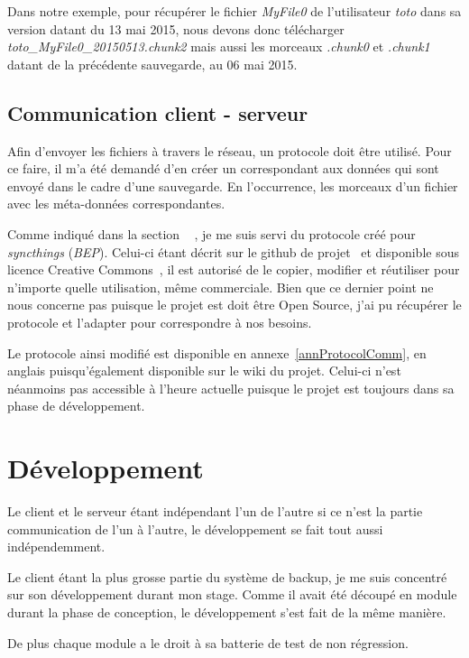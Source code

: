 \documentclass[a4paper,10pt, twoside]{report}
\begin{document}
\begin{spacing}{1.2}
Dans notre exemple, pour r\'ecup\'erer le fichier \textit{MyFile0} de
l'utilisateur \textit{toto}  dans sa version datant du 13 mai 2015, nous devons
donc t\'el\'echarger \textit{toto\_MyFile0\_20150513.chunk2} mais aussi les
morceaux \textit{.chunk0} et \textit{.chunk1} datant de la pr\'ec\'edente
sauvegarde, au 06 mai 2015.

\subsection{Communication client - serveur}
Afin d'envoyer les fichiers \`a travers le r\'eseau, un protocole doit \^etre
utilis\'e. Pour ce faire, il m'a \'et\'e demand\'e d'en cr\'eer un correspondant
aux donn\'ees qui sont envoy\'e dans le cadre d'une sauvegarde. En l'occurrence,
les morceaux d'un fichier avec les m\'eta-donn\'ees correspondantes.

Comme indiqu\'e dans la section \flqq~ \frqq, je me
suis servi du protocole cr\'e\'e pour \textit{syncthings} (\textit{BEP}).
Celui-ci \'etant d\'ecrit sur le github de projet~\cite{refBEP} et
disponible sous licence Creative Commons~\cite{refCC4.0}, il est autoris\'e de
le copier, modifier et r\'eutiliser pour n'importe quelle utilisation, m\^eme
commerciale. Bien que ce dernier point ne nous concerne pas puisque le projet
est doit \^etre Open Source, j'ai pu r\'ecup\'erer le protocole et l'adapter
pour correspondre \`a nos besoins.

Le protocole ainsi modifi\'e est disponible en annexe~\ref{annProtocolComm}, en
anglais puisqu'\'egalement disponible sur le wiki du projet. Celui-ci n'est
n\'eanmoins pas accessible \`a l'heure actuelle puisque le projet est toujours
dans sa phase de d\'eveloppement.


\section{D\'eveloppement}
Le client et le serveur \'etant ind\'ependant l'un de l'autre si ce n'est la
partie communication de l'un \`a l'autre, le d\'eveloppement se fait tout
aussi ind\'ependemment.

Le client \'etant la plus grosse partie du syst\`eme de backup, je me suis
concentr\'e sur son d\'eveloppement durant mon stage. Comme il avait \'et\'e
d\'ecoup\'e en module durant la phase de conception, le d\'eveloppement s'est
fait de la m\^eme mani\`ere.

De plus chaque module a le droit \`a sa batterie de test de non r\'egression.


\end{spacing}
\end{document}
